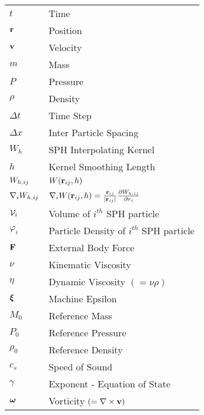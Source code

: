 \begin{longtable}{ll}
$t$                     & Time                              \\
$\vect{r}$              & Position                          \\
$\vect{v}$              & Velocity                          \\
$m$                     & Mass                              \\
$P$                     & Pressure                          \\
$\rho$                  & Density                           \\
$\Delta t$              & Time Step                         \\
$\Delta x$              & Inter Particle Spacing            \\
$W_{h}$                 & SPH Interpolating Kernel          \\
$h$                     & Kernel Smoothing Length           \\
$\WIJ$                  & $W(\RIJ, h)$                      \\
$\DWIJ$                        & $\nabla_i W(\RIJ,h) = \frac{\RIJ}{\RtwoIJ[]} \PartialDerivative[r_i]{\WIJ}$                 \\
$\Vol_i$                & Volume of $i^{th}$ SPH particle   \\
$\varphi_i$                    & Particle Density of $i^{th}$ SPH particle                                                   \\
$\vect{F}$              & External Body Force               \\
$\nu$                   & Kinematic Viscosity               \\
$\eta$                  & Dynamic Viscosity $(=\nu \rho)$   \\
$\MachineEpsilon$       & Machine Epsilon                   \\
$M_0$                   & Reference Mass                    \\
$P_0$                   & Reference Pressure                \\
$\rho_0$                & Reference Density                 \\
$c_s$                   & Speed of Sound                    \\
$\gamma$                & Exponent - Equation of State      \\
$\Vorticity$                   & Vorticity $(=\nabla \times \vect{v})$                                                       \\

\end{longtable}
